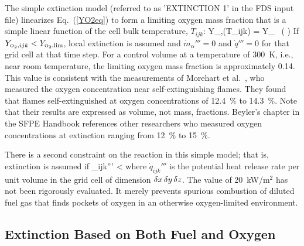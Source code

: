 The simple extinction model (referred to as {\ct 'EXTINCTION 1'} in the FDS input file) linearizes Eq.~(\ref{YO2eq}) to form a limiting oxygen mass fraction that is a simple linear function of the cell bulk temperature, $T_{ijk}$:
\be
   Y_{\OTWO,\lim}(T_{ijk}) = Y_{\OI} \, \left(  \right)  \label{extinction_model}
\ee
If $Y_{\text{\tiny \hbox{O}$_2$},ijk}<Y_{\text{\tiny \hbox{O}$_2$},\lim}$, local extinction is assumed and $\dot{m}_\alpha'''=0$ and $\dot{q}'''=0$ for that grid cell at that time step. For a control volume at a temperature of \SI{300}{K}, i.e., near room temperature, the limiting oxygen mass fraction is approximately 0.14.  This value is consistent with the measurements of Morehart et al.~\cite{Morehart:1991}, who measured the oxygen concentration near self-extinguishing flames. They found that flames self-extinguished at oxygen concentrations of 12.4~\% to 14.3~\%. Note that their results are expressed as volume, not mass, fractions. Beyler's chapter in the SFPE Handbook references other researchers who measured oxygen concentrations at extinction ranging from 12~\% to 15~\%.

There is a second constraint on the reaction in this simple model; that is, extinction is assumed if
\be
   _{ijk}''' <  \; 
\ee
where $\dot{q}_{ijk}'''$ is the potential heat release rate per unit volume in the grid cell of dimension $\delta x \, \delta y \, \delta z$. The value of 20~kW/m$^2$ has not been rigorously evaluated. It merely prevents spurious combustion of diluted fuel gas that finds pockets of oxygen in an otherwise oxygen-limited environment.

\subsection{Extinction Based on Both Fuel and Oxygen}


